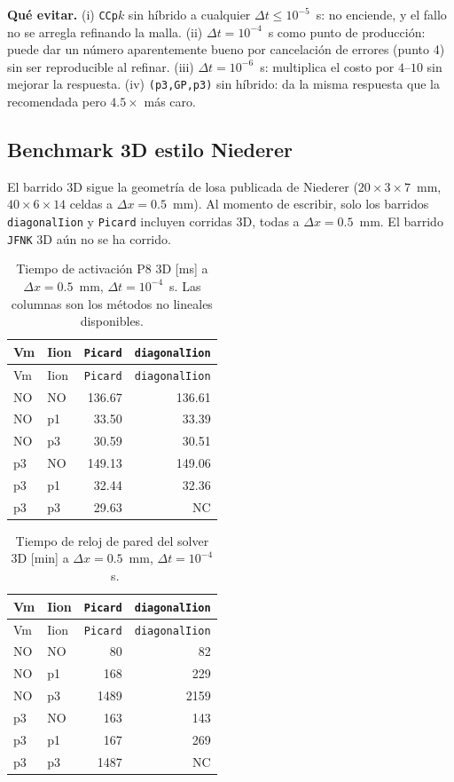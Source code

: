 \documentclass[11pt,a4paper]{article}
\newcommand{\code}[1]{\texttt{\small #1}}
\begin{document}
\noindent\textbf{Qué evitar.} (i) \code{CCp$k$} sin híbrido a cualquier
$\Delta t\le 10^{-5}$~s: no enciende, y el fallo no se arregla refinando la malla.
(ii) $\Delta t=10^{-4}$~s como punto de producción: puede dar un número aparentemente
bueno por cancelación de errores (punto 4) sin ser reproducible al refinar.
(iii) $\Delta t=10^{-6}$~s: multiplica el costo por $4$--$10$ sin mejorar la respuesta.
(iv) \code{(p3,GP,p3)} sin híbrido: da la misma respuesta que la recomendada pero
$4.5\times$ más caro.
\subsection{Benchmark 3D estilo Niederer}
\label{sec:results:3D}

El barrido 3D sigue la geometría de losa publicada de Niederer
($20\times 3\times 7$~mm, $40\times 6\times 14$ celdas a $\Delta x = 0.5$~mm). Al
momento de escribir, solo los barridos \code{diagonalIion} y \code{Picard} incluyen
corridas 3D, todas a $\Delta x = 0.5$~mm. El barrido \code{JFNK} 3D aún no se ha
corrido.

\begin{center}\footnotesize
\begin{longtable}{llrr}
\caption{Tiempo de activación P8 3D [ms] a $\Delta x = 0.5$~mm,
$\Delta t = 10^{-4}$~s. Las columnas son los métodos no lineales disponibles.}\\
\toprule
Vm & Iion & \code{Picard} & \code{diagonalIion} \\
\midrule\endfirsthead\toprule
Vm & Iion & \code{Picard} & \code{diagonalIion} \\
\midrule\endhead
NO & NO & 136.67 & 136.61 \\
NO & p1 &  33.50 &  33.39 \\
NO & p3 &  30.59 &  30.51 \\
p3 & NO & 149.13 & 149.06 \\
p3 & p1 &  32.44 &  32.36 \\
p3 & p3 &  29.63 & NC     \\
\bottomrule\end{longtable}\end{center}

\begin{center}\footnotesize
\begin{longtable}{llrr}
\caption{Tiempo de reloj de pared del solver 3D [min] a $\Delta x = 0.5$~mm,
$\Delta t = 10^{-4}$~s.}\\
\toprule
Vm & Iion & \code{Picard} & \code{diagonalIion} \\
\midrule\endfirsthead\toprule
Vm & Iion & \code{Picard} & \code{diagonalIion} \\
\midrule\endhead
NO & NO &   80 &   82 \\
NO & p1 &  168 &  229 \\
NO & p3 & 1489 & 2159 \\
p3 & NO &  163 &  143 \\
p3 & p1 &  167 &  269 \\
p3 & p3 & 1487 & NC   \\
\bottomrule\end{longtable}\end{center}
\end{document}
